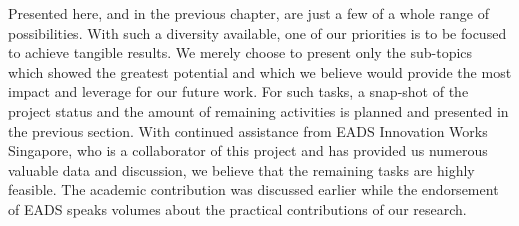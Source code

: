 
Presented here, and in the previous chapter, are just a few of a whole range of possibilities. 
With such a diversity available, one of our priorities is to be focused to achieve tangible results.
We merely choose to present only the sub-topics which showed the greatest potential and which we believe would provide the most impact and leverage for our future work.
For such tasks, a snap-shot of the project status and the amount of remaining activities is planned and presented in the previous section.
With continued assistance from EADS Innovation Works Singapore, who is a collaborator of this project and has provided us numerous valuable data and discussion, we believe that the remaining tasks are highly feasible.
The academic contribution was discussed earlier while the endorsement of EADS speaks volumes about the practical contributions of our research.


